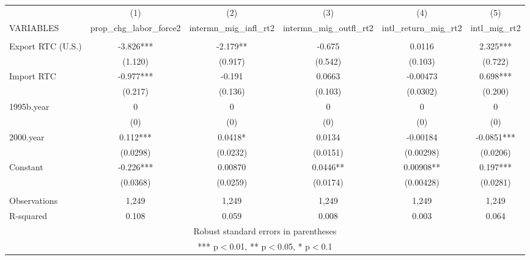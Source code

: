 \begin{tabular}{lccccc} \hline
 & (1) & (2) & (3) & (4) & (5) \\
VARIABLES & prop\_chg\_labor\_force2 & intermn\_mig\_infl\_rt2 & intermn\_mig\_outfl\_rt2 & intl\_return\_mig\_rt2 & intl\_mig\_rt2 \\ \hline
 &  &  &  &  &  \\
Export RTC (U.S.) & -3.826*** & -2.179** & -0.675 & 0.0116 & 2.325*** \\
 & (1.120) & (0.917) & (0.542) & (0.103) & (0.722) \\
Import RTC & -0.977*** & -0.191 & 0.0663 & -0.00473 & 0.698*** \\
 & (0.217) & (0.136) & (0.103) & (0.0302) & (0.200) \\
1995b.year & 0 & 0 & 0 & 0 & 0 \\
 & (0) & (0) & (0) & (0) & (0) \\
2000.year & 0.112*** & 0.0418* & 0.0134 & -0.00184 & -0.0851*** \\
 & (0.0298) & (0.0232) & (0.0151) & (0.00298) & (0.0206) \\
Constant & -0.226*** & 0.00870 & 0.0446** & 0.00908** & 0.197*** \\
 & (0.0368) & (0.0259) & (0.0174) & (0.00428) & (0.0281) \\
 &  &  &  &  &  \\
Observations & 1,249 & 1,249 & 1,249 & 1,249 & 1,249 \\
 R-squared & 0.108 & 0.059 & 0.008 & 0.003 & 0.064 \\ \hline
\multicolumn{6}{c}{ Robust standard errors in parentheses} \\
\multicolumn{6}{c}{ *** p$<$0.01, ** p$<$0.05, * p$<$0.1} \\
\end{tabular}
